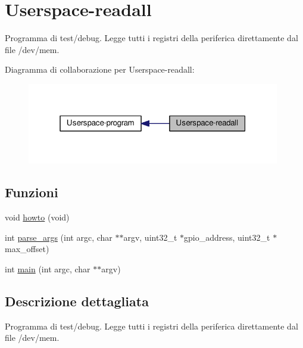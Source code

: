\hypertarget{group__userspace-readall}{\section{Userspace-\/readall}
\label{group__userspace-readall}
}


Programma di test/debug. Legge tutti i registri della periferica direttamente dal file /dev/mem.  


Diagramma di collaborazione per Userspace-\/readall\+:\nopagebreak
\begin{figure}[H]
\begin{center}
\leavevmode
\includegraphics[width=313pt]{group__userspace-readall}
\end{center}
\end{figure}
\subsection*{Funzioni}
\begin{DoxyCompactItemize}
\item 
void \hyperlink{group__userspace-readall_ga05909651fa170a63e98e3f8e13451b7b}{howto} (void)
\item 
int \hyperlink{group__userspace-readall_ga87c1177178432113628b0885b0cff1b2}{parse\+\_\+args} (int argc, char $\ast$$\ast$argv, uint32\+\_\+t $\ast$gpio\+\_\+address, uint32\+\_\+t $\ast$max\+\_\+offset)
\item 
int \hyperlink{group__userspace-readall_ga3c04138a5bfe5d72780bb7e82a18e627}{main} (int argc, char $\ast$$\ast$argv)
\end{DoxyCompactItemize}


\subsection{Descrizione dettagliata}
Programma di test/debug. Legge tutti i registri della periferica direttamente dal file /dev/mem. 



